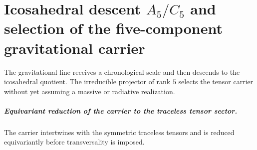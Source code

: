 \chapter{Icosahedral descent \texorpdfstring{\(A_5/C_5\)}{A₅/C₅} and selection of the five-component gravitational carrier}
\label{chap:parte-iv-63}

The gravitational line receives a chronological scale and then descends to the icosahedral quotient. The irreducible projector of rank \(5\) selects the tensor carrier without yet assuming a massive or radiative realization.



\paragraph{Equivariant reduction of the carrier to the traceless tensor sector.} The carrier intertwines with the symmetric traceless tensors and is reduced equivariantly before transversality is imposed.
